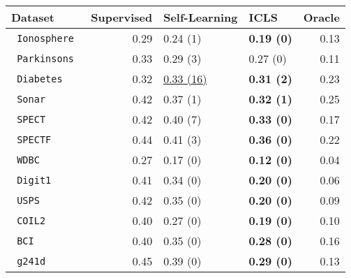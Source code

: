 \begin{table}[ht]
\centering
\begin{tabular}{lrllr}
  \hline
Dataset & Supervised & Self-Learning & ICLS & Oracle \\ 
  \hline
\texttt{ Ionosphere } & 0.29 & 0.24 (1) & \textbf{0.19 (0)} & 0.13 \\ 
  \texttt{ Parkinsons } & 0.33 & 0.29 (3) & 0.27 (0) & 0.11 \\ 
  \texttt{ Diabetes } & 0.32 & \underline{0.33 (16)} & \textbf{0.31 (2)} & 0.23 \\ 
  \texttt{ Sonar } & 0.42 & 0.37 (1) & \textbf{0.32 (1)} & 0.25 \\ 
  \texttt{ SPECT } & 0.42 & 0.40 (7) & \textbf{0.33 (0)} & 0.17 \\ 
  \texttt{ SPECTF } & 0.44 & 0.41 (3) & \textbf{0.36 (0)} & 0.22 \\ 
  \texttt{ WDBC } & 0.27 & 0.17 (0) & \textbf{0.12 (0)} & 0.04 \\ 
  \texttt{ Digit1 } & 0.41 & 0.34 (0) & \textbf{0.20 (0)} & 0.06 \\ 
  \texttt{ USPS } & 0.42 & 0.35 (0) & \textbf{0.20 (0)} & 0.09 \\ 
  \texttt{ COIL2 } & 0.40 & 0.27 (0) & \textbf{0.19 (0)} & 0.10 \\ 
  \texttt{ BCI } & 0.40 & 0.35 (0) & \textbf{0.28 (0)} & 0.16 \\ 
  \texttt{ g241d } & 0.45 & 0.39 (0) & \textbf{0.29 (0)} & 0.13 \\ 
   \hline
\end{tabular}
\end{table}
